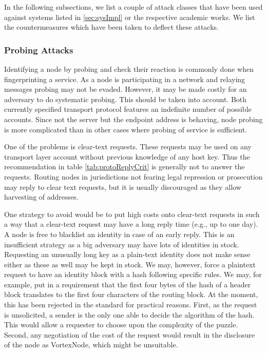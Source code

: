 In the following subsections, we list a couple of attack classes that have been used against systems listed in \ref{sec:sysImpl} or the respective academic works. We list the countermeasures which have been taken to deflect these attacks.

\subsubsection{Probing Attacks}
Identifying a node by probing and check their reaction is commonly done when fingerprinting a service. As a node is participating in a network and relaying messages probing may not be evaded. However, it may be made costly for an adversary to do systematic probing. This should be taken into account. Both currently specified transport protocol features an indefinite number of possible accounts. Since not the server but the endpoint address is behaving, node probing is more complicated than in other cases where probing of service is sufficient. 

One of the problems is clear-text requests. These requests may be used on any transport layer account without previous knowledge of any host key. Thus the recommendation in table \ref{tab:protoReplyCrit} is generally not to answer the requests. Routing nodes in jurisdictions not fearing legal repression or prosecution may reply to clear text requests, but it is usually discouraged as they allow harvesting of addresses.

One strategy to avoid would be to put high costs onto clear-text requests in such a way that a clear-text request may have a long reply time (e.g., up to one day). A node is free to blacklist an identity in case of an early reply. This is an insufficient strategy as a big adversary may have lots of identities in stock. Requesting an unusually long key as a plain-text identity does not make sense either as these as well may be kept in stock. We may, however, force a plaintext request to have an identity block with a hash following specific rules. We may, for example, put in a requirement that the first four bytes of the hash of a header block translates to the first four characters of the routing block. At the moment, this has been rejected in the standard for practical reasons. First, as the request is unsolicited, a sender is the only one able to decide the algorithm of the hash. This would allow a requester to choose upon the complexity of the puzzle. Second, any negotiation of the cost of the request would result in the disclosure of the node as VortexNode, which might be unsuitable.

